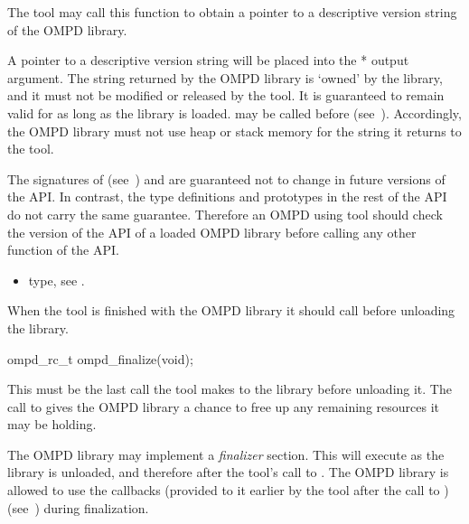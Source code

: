 \descr
The tool may call this function to obtain a pointer to a descriptive version string of the OMPD library.

\argdesc
A pointer to a descriptive version string will be placed into the * output argument.
The string returned by the
OMPD library is `owned' by the library, and it must not be modified or released by the tool.
It is guaranteed to remain valid for as long as the library is loaded.
may be called before  (see~).
Accordingly, the OMPD library must not use heap or
stack memory for the string it returns to the tool.

The signatures of  (see~)
and  are
guaranteed not to change in future versions of the API. In contrast, the type definitions and
prototypes in the rest of the API do not carry the same guarantee. Therefore an OMPD using tool
should check the version of the API of a loaded OMPD library before calling any other function of
the API.

\crossreferences
\begin{itemize}
	\item {} type, see .
\end{itemize}

\label{subsubsubsec:ompd_finalize}

\summary
When the tool is finished with the OMPD library it should call  before
unloading the library.

\format

\begin{cspecific}
\begin{ompSyntax}
ompd_rc_t ompd_finalize(void);
\end{ompSyntax}
\end{cspecific}


\descr
This must be the last call the tool makes to the library before
unloading it. The call to  gives the OMPD library a chance to
free up any remaining resources it may be holding.

The OMPD library may implement a \emph{finalizer} section. This will execute as the library is
unloaded, and therefore after the tool's call to . The OMPD library is allowed
to use the callbacks (provided to it earlier by the tool after the call to
) (see~) during finalization.

